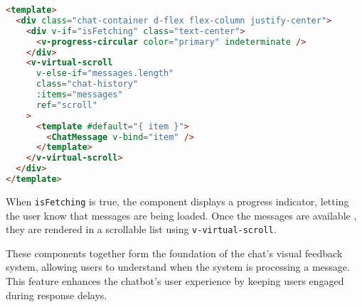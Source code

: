 \begin{lstlisting}[language=HTML, caption={Template for ChatHistory.vue (\texttt{ChatHistory.vue})},
  firstnumber=33,label={lst:chat-history-template}]
<template>
  <div class="chat-container d-flex flex-column justify-center">
    <div v-if="isFetching" class="text-center">
      <v-progress-circular color="primary" indeterminate />
    </div>
    <v-virtual-scroll
      v-else-if="messages.length"
      class="chat-history"
      :items="messages"
      ref="scroll"
    >
      <template #default="{ item }">
        <ChatMessage v-bind="item" />
      </template>
    </v-virtual-scroll>
  </div>
</template>
\end{lstlisting}

When \texttt{isFetching} is true, the component displays a progress indicator, letting the user know
that messages are being loaded. Once the messages are available
, they are rendered in a scrollable list using \texttt{v-virtual-scroll}.

These components together form the foundation of the chat's visual feedback system, allowing users to understand when
the system is processing a message. This feature enhances the chatbot's user experience by keeping users engaged during
response delays.
